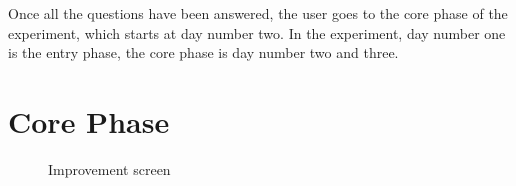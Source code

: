 Once all the questions have been answered, the user goes to the core phase of the experiment, which starts at day number two. In the experiment, day number one is the entry phase, the core phase is day number two and three.

\section{Core Phase} \label{core}


\begin{figure}[htp]
  \hspace{1em}
  \caption{Improvement screen\label{fig:imp}}
\end{figure}

